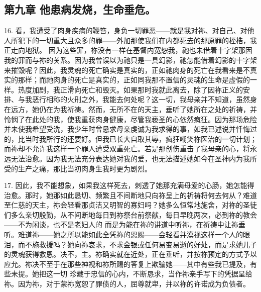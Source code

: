 
\subsection{第九章 他患病发烧，生命垂危。}

16. 看，我遭受了肉身疾病的鞭笞，身负一切罪恶——就是我对祢、对自己、对他人所犯下的一切重大且众多的罪——外加那使我们在内都死去的那原罪的桎梏，我正走向地狱。 因为这些罪，祢没有一样在基督内宽恕我，祂也未借着十字架那因我的罪而与祢的关系。因为我曾误以为祂只是一具幻影，祂怎能借着幻影的十字架来摧毁呢？因此，我灵魂的死亡确实是真实的，正如祂肉身的死亡在我看来是不真实的那样；而祂肉身的死亡是真实的，正如同我那不置信的灵魂的生命是虚假的一样。热度加剧，我正滑向死亡和毁灭。如果那时我就此离去，除了因祢正义的安排、与我恶行相称的火刑之外，我能去何处呢？这一切，我母亲并不知道，虽然身在远方，她仍在为我祈祷。然而，无所不在的天主，垂听了她所在之处的祈祷，并怜悯了在此处的我，使我重获肉身健康，尽管我亵圣的心依然疯狂。因为那场危险并未使我希望受洗，我少年时曾恳求母亲虔诚为我求得的事，如我已述说并忏悔过的，比当时我所行的还要好。但我已长大自取其辱，疯狂嘲笑祢医治的一切计划；而祢却不允许我这样一个罪人遭受双重死亡。若是那创伤重击了我母亲的心，将永远无法治愈。因为我无法充分表达她对我的爱，也无法描述她如今在圣神内为我所受的生产之痛，那比当初肉身生我时更为剧烈。\par

17. 因此，我不能想象，如果我这样死去，刺透了她那充满母爱的心肠，她怎能得治愈。那时，她那如此恳切、频繁且不间断地只向祢呈上的祈祷将何去何从？难道至仁慈的天主，祢会轻看那贞洁又明智的寡妇吗？她多么恒常地施舍，对祢的圣徒们多么亲切殷勤，从不间断地每日到祢祭台前祭献，每日早晚两次，必到祢的教会——不为闲谈，也不是老妇人的 而是为能在祢的讲道中听祢，在祈祷中让祢垂听。难道祢——她之所以能如此全凭祢的恩赐——会轻看并漠视这样一个人的眼泪，而不施救援吗？她向祢哀求，不求金银或任何易变易逝的好处，而是求她儿子的灵魂获得救恩。决不，主。祢确实就在近处，正在垂听，并按祢预定的方式予以应允。祢决不至于在那些神视和祢所赐的答复上欺骗她——其中有些我已提及，有些未提。她把这一切 珍藏于忠信的心内，不断恳求，当作祢亲手写下的凭据呈给祢。因为祢，对于蒙祢宽恕了罪债的人，屈尊就卑，并以祢的许诺成为负债者。\par



